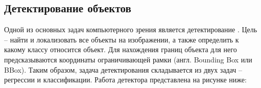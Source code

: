 \subsection{Детектирование объектов}

Одной из основных задач компьютерного зрения является детектирование \cite{lib-detection-task}. Цель -- найти и локализовать все объекты на изображении, а также определить к какому классу относится объект. Для нахождения границ объекта для него предсказываются координаты ограничивающей рамки (англ. Bounding Box или BBox). Таким образом, задача детектирования складывается из двух задач -- регрессии и классификации. Работа детектора представлена на рисунке ниже:


